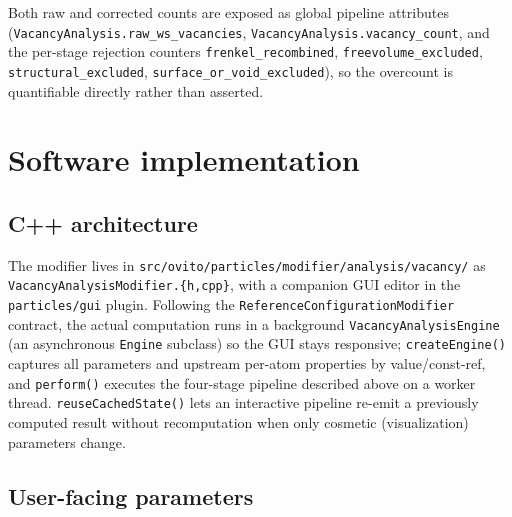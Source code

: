 \documentclass[11pt]{article}
\newcommand{\code}[1]{\texttt{#1}}
\newcommand{\attr}[1]{\texttt{#1}}
\begin{document}
Both raw and corrected counts are exposed as global pipeline attributes
(\attr{VacancyAnalysis.raw\_ws\_vacancies}, \attr{VacancyAnalysis.vacancy\_count}, and the
per-stage rejection counters \attr{frenkel\_recombined}, \attr{freevolume\_excluded},
\attr{structural\_excluded}, \attr{surface\_or\_void\_excluded}), so the overcount is quantifiable
directly rather than asserted.

\section{Software implementation}

\subsection{C++ architecture}

The modifier lives in \code{src/ovito/particles/modifier/analysis/vacancy/} as
\code{VacancyAnalysisModifier.\{h,cpp\}}, with a companion GUI editor in the \code{particles/gui}
plugin. Following the \code{ReferenceConfigurationModifier} contract, the actual computation runs
in a background \code{VacancyAnalysisEngine} (an asynchronous \code{Engine} subclass) so the GUI
stays responsive; \code{createEngine()} captures all parameters and upstream per-atom properties by
value/const-ref, and \code{perform()} executes the four-stage pipeline described above on a worker
thread. \code{reuseCachedState()} lets an interactive pipeline re-emit a previously computed result
without recomputation when only cosmetic (visualization) parameters change.

\subsection{User-facing parameters}
\end{document}
